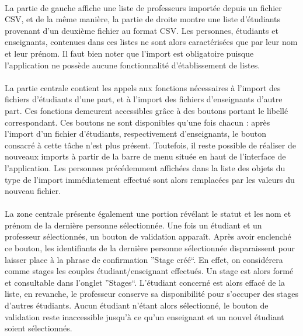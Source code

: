 \documentclass[a4paper,10pt]{report}
\begin{document}
	    \paragraph{}
	      La partie de gauche affiche une liste de professeurs importée depuis un fichier CSV, et de la même manière, la partie de droite montre une liste d'étudiants provenant d'un deuxième fichier au format CSV.
	      Les personnes, étudiants et enseignants, contenues dans ces listes ne sont alors caractérisées que par leur nom et leur prénom.
	      Il faut bien noter que l'import est obligatoire puisque l'application ne possède aucune fonctionnalité d'établissement de listes.
	    
	    \paragraph{}
	      La partie centrale contient les appels aux fonctions nécessaires à l'import des fichiers d'étudiants d'une part, et à l'import des fichiers d'enseignants d'autre part.
	      Ces fonctions demeurent accessibles grâce à des boutons portant le libellé correspondant.
	      Ces boutons ne sont disponibles qu'une fois chacun : après l'import d'un fichier d'étudiants, respectivement d'enseignants, le bouton consacré à cette tâche n'est plus présent.
	      Toutefois, il reste possible de réaliser de nouveaux imports à partir de la barre de menu située en haut de l'interface de l'application.
	      Les personnes précédemment affichées dans la liste des objets du type de l'import immédiatement effectué sont alors remplacées par les valeurs du nouveau fichier.  
	      
	    \paragraph{}      
	      La zone centrale présente également une portion révélant le statut et les nom et prénom de la dernière personne sélectionnée.
	      Une fois un étudiant et un professeur sélectionnés, un bouton de validation apparaît.
	      Après avoir enclenché ce bouton, les identifiants de la dernière personne sélectionnée disparaissent pour laisser place à la phrase de confirmation ''Stage créé``.
	      En effet, on considérera comme stages les couples étudiant/enseignant effectués.
	      Un stage est alors formé et consultable dans l'onglet ''Stages``. 
	      L'étudiant concerné est alors effacé de la liste, en revanche, le professeur conserve sa disponibilité pour s'occuper des stages d'autres étudiants.
	      Aucun étudiant n'étant alors sélectionné, le bouton de validation reste inaccessible jusqu'à ce qu'un enseignant et un nouvel étudiant soient sélectionnés.
	      
\end{document}
